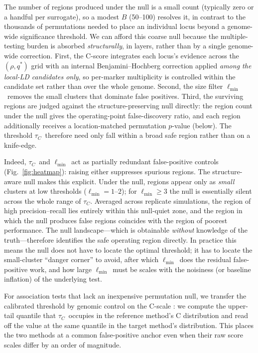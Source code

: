\documentclass[11pt]{article}
\newcommand{\tauc}{\ensuremath{\tau_C}}
\newcommand{\lmin}{\ensuremath{\ell_{\min}}}
\begin{document}
The number of regions produced under the null is a small count (typically zero
or a handful per surrogate), so a modest $B$ (50--100) resolves it, in contrast
to the thousands of permutations needed to place an individual locus beyond a
genome-wide significance threshold. We can afford this coarse null because the
multiple-testing burden is absorbed \emph{structurally}, in layers, rather than by a
single genome-wide correction. First, the C-score integrates each locus's evidence
across the $(\rho, q^*)$ grid with an internal Benjamini--Hochberg correction
\citep{benjamini1995controlling} applied \emph{among the local-LD candidates only},
so per-marker multiplicity is controlled within the candidate set rather than over
the whole genome. Second, the size filter \lmin\ removes the small clusters that
dominate false positives. Third, the surviving regions are judged against the
structure-preserving null directly: the region count under the null gives the
operating-point false-discovery ratio, and each region additionally receives a
location-matched permutation $p$-value (below). The threshold \tauc\ therefore need
only fall within a broad safe region rather than on a knife-edge.

Indeed, \tauc\ and \lmin\ act as partially redundant false-positive controls
(Fig.~\ref{fig:heatmap}): raising either suppresses spurious regions. The
structure-aware null makes this explicit. Under the null, regions appear only as
\emph{small} clusters at low thresholds ($\lmin = 1$--$2$); for $\lmin \ge 3$ the
null is essentially silent across the whole range of \tauc. Averaged across
replicate simulations, the region of high precision--recall lies entirely within
this null-quiet zone, and the region in which the null produces false regions
coincides with the region of poorest performance. The null landscape---which is
obtainable \emph{without} knowledge of the truth---therefore identifies the safe
operating region directly. In practice this means the null does not have to
locate the optimal threshold; it has to locate the small-cluster ``danger
corner'' to avoid, after which \lmin\ does the residual false-positive work, and
how large \lmin\ must be scales with the noisiness (or baseline inflation) of the
underlying test.

For association tests that lack an inexpensive permutation null, we transfer the
calibrated threshold by genomic control on the C-scale
\citep{devlin1999genomic}: we compute the upper-tail quantile that \tauc\
occupies in the reference method's C distribution and read off the value at the
same quantile in the target method's distribution. This places the two methods
at a common false-positive anchor even when their raw score scales differ by an
order of magnitude.
\end{document}
